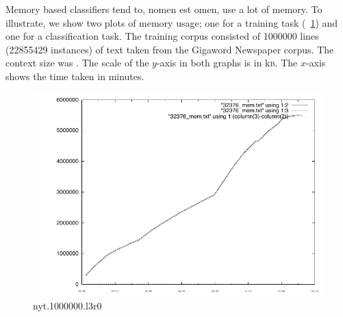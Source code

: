 \documentclass[a4paper,10pt,twoside]{report}
\begin{document}

Memory based classifiers tend to, nomen est omen, use a lot of
memory. To illustrate, we show two plots of memory usage; one for a
training task (\figurename~\ref{fig:32376_mem.pdf}) and one for a
classification task. The training corpus consisted of \num{1000000}
lines (\num{22855429} instances) of text taken from the Gigaword
Newspaper corpus. The context size was . The scale of the
$y$-axis in both graphs is in k\textsc{b}. The $x$-axis shows the time
taken in minutes.

\begin{figure}[!ht]
  \centering
  \includegraphics[width=\pdfwidth]{32376_mem.pdf}
 \caption{nyt.1000000.l3r0}
  \label{fig:32376_mem.pdf}
\end{figure}
\end{document}
